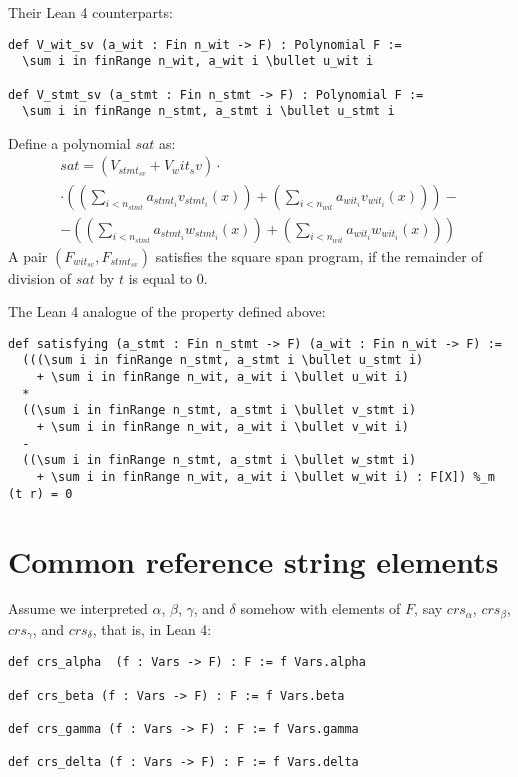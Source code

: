 \documentclass{article}
\theoremstyle{definition}
\theoremstyle{remark}
\begin{document}
Their Lean 4 counterparts:
\begin{lstlisting}
def V_wit_sv (a_wit : Fin n_wit -> F) : Polynomial F :=
  \sum i in finRange n_wit, a_wit i \bullet u_wit i

def V_stmt_sv (a_stmt : Fin n_stmt -> F) : Polynomial F :=
  \sum i in finRange n_stmt, a_stmt i \bullet u_stmt i
\end{lstlisting}


Define a polynomial $sat$ as:
\begin{multline}
sat = (V_{{stmt}_{sv}} + V_wit_sv) \cdot \\ \cdot ((\sum \limits_{i < n_{stmt}} a_{{stmt}_i} v_{{stmt}_i}(x)) + (\sum \limits_{i < n_{wit}} a_{{wit}_i} v_{{wit}_i}(x) )) - \\ - ((\sum \limits_{i < n_{stmt}} a_{{stmt}_i} w_{{stmt}_i}(x)) + (\sum \limits_{i < n_{wit}} a_{{wit}_i} w_{{wit}_i}(x) ))
\end{multline}
A pair $(F_{{wit}_{sv}}, F_{{stmt}_{sv}})$ satisfies the square span program, if the remainder of division of $sat$ by $t$ is equal to $0$.

The Lean 4 analogue of the property defined above:
\begin{lstlisting}
def satisfying (a_stmt : Fin n_stmt -> F) (a_wit : Fin n_wit -> F) :=
  (((\sum i in finRange n_stmt, a_stmt i \bullet u_stmt i)
    + \sum i in finRange n_wit, a_wit i \bullet u_wit i)
  *
  ((\sum i in finRange n_stmt, a_stmt i \bullet v_stmt i)
    + \sum i in finRange n_wit, a_wit i \bullet v_wit i)
  -
  ((\sum i in finRange n_stmt, a_stmt i \bullet w_stmt i)
    + \sum i in finRange n_wit, a_wit i \bullet w_wit i) : F[X]) %_m (t r) = 0
\end{lstlisting}

\section{Common reference string elements}

Assume we interpreted $\alpha$, $\beta$, $\gamma$, and $\delta$ somehow with elements of $F$, say $crs_{\alpha}$, $crs_{\beta}$, $crs_{\gamma}$, and $crs_{\delta}$, that is, in Lean 4:

\begin{lstlisting}
def crs_alpha  (f : Vars -> F) : F := f Vars.alpha

def crs_beta (f : Vars -> F) : F := f Vars.beta

def crs_gamma (f : Vars -> F) : F := f Vars.gamma

def crs_delta (f : Vars -> F) : F := f Vars.delta
\end{lstlisting}
\end{document}
